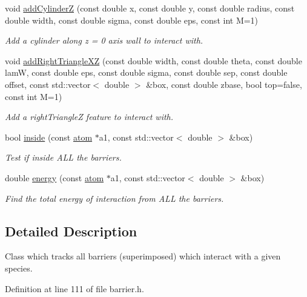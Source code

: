 \begin{DoxyCompactItemize}
void \hyperlink{classcomposite_barrier_afd40edf14705cf306c72120bb8a59042}{add\-Cylinder\-Z} (const double x, const double y, const double radius, const double width, const double sigma, const double eps, const int M=1)
\begin{DoxyCompactList}\small\item\em Add a cylinder along z = 0 axis wall to interact with. \end{DoxyCompactList}\item 
void \hyperlink{classcomposite_barrier_aea879332cf03f00463b9c8ca4ca28680}{add\-Right\-Triangle\-X\-Z} (const double width, const double theta, const double lam\-W, const double eps, const double sigma, const double sep, const double offset, const std\-::vector$<$ double $>$ \&box, const double zbase, bool top=false, const int M=1)
\begin{DoxyCompactList}\small\item\em Add a right\-Triangle\-Z feature to interact with. \end{DoxyCompactList}\item 
bool \hyperlink{classcomposite_barrier_a20989cccc8f4a14df710c2eb7cbd1e71}{inside} (const \hyperlink{classatom}{atom} $\ast$a1, const std\-::vector$<$ double $>$ \&box)
\begin{DoxyCompactList}\small\item\em Test if inside A\-L\-L the barriers. \end{DoxyCompactList}\item 
double \hyperlink{classcomposite_barrier_ac464755b3a2b31643bb70ddb84b0d399}{energy} (const \hyperlink{classatom}{atom} $\ast$a1, const std\-::vector$<$ double $>$ \&box)
\begin{DoxyCompactList}\small\item\em Find the total energy of interaction from A\-L\-L the barriers. \end{DoxyCompactList}\end{DoxyCompactItemize}


\subsection{Detailed Description}
Class which tracks all barriers (superimposed) which interact with a given species. 

Definition at line 111 of file barrier.\-h.



